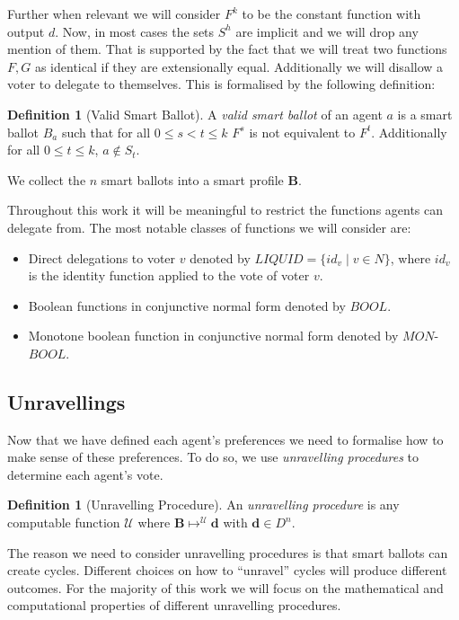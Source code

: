 \documentclass[11pt,a4paper, titlepage]{article}
\theoremstyle{definition}
\newtheorem{definition}[theorem]{Definition}
\let\vec\mathbf
\begin{document}
Further when relevant we will consider $F^{k}$ to be the constant function with output $d$. 
Now, in most cases the sets $S^h$ are implicit and we will drop any mention of them. 
That is supported by the fact that we will treat two functions $F, G$ as identical if they are extensionally equal. 
Additionally we will disallow a voter to delegate to themselves. 
This is formalised by the following definition:

\begin{definition}[Valid Smart Ballot]
    A \emph{valid smart ballot} of an agent $a$ is a smart ballot $B_a$ such that for all $ 0 \leq s < t \leq k$ $F^s$ is not equivalent to $F^t$. Additionally for all $0 \leq t \leq k$, $a \notin S_t$.
\end{definition}


We collect the $n$ smart ballots into a smart profile $\mathbf{B}$.

Throughout this work it will be meaningful to restrict the functions agents can delegate from. The most notable classes of functions we will consider are: 

\begin{itemize}
    \item Direct delegations to voter $v$ denoted by $\mathit{LIQUID} = \{\mathit{id}_v \mid v \in N\}$, where $\mathit{id}_v$ is the identity function applied to the vote of voter $v$.
    \item Boolean functions in conjunctive normal form denoted by $\mathit{BOOL}$. 
    \item Monotone boolean function in conjunctive normal form denoted by $\mathit{MON}$-$\mathit{BOOL}$.
\end{itemize}

\subsection{Unravellings}

Now that we have defined each agent's preferences we need to formalise how to make sense of these preferences. To do so, we use \emph{unravelling procedures} to determine each agent's vote.

\begin{definition}[Unravelling Procedure]
    An \emph{unravelling procedure} is any computable function $\mathcal{U}$ where $\mathbf{B} \mapsto^\mathcal{U} \vec{d}$ with $\vec{d} \in D^n$.
\end{definition}

The reason we need to consider unravelling procedures is that smart ballots can create cycles.
Different choices on how to ``unravel'' cycles will produce different outcomes.
For the majority of this work we will focus on the mathematical and computational properties of different unravelling procedures.
\end{document}
